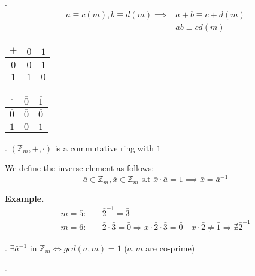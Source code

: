 \Remark.
\begin{align*}
  a \equiv c(m), b \equiv d(m) \implies & a+b \equiv c+d(m) \\
                                        & ab \equiv cd (m)
\end{align*}
\begin{center}
\begin{minipage}[t]{0.2\textwidth}
    \begin{tabular}{c|cc}
      $+$             & $\overline{0}$  & $\overline{1}$\\
      \hline
      $\overline{0}$  & $\overline{0}$  & $\overline{1}$\\
      $\overline{1}$  & $\overline{1}$  & $\overline{0}$\\
    \end{tabular}
\end{minipage}
\begin{minipage}[t]{0.2\textwidth}
  \begin{tabular}{c|cc}
    $\cdot$         & $\overline{0}$  & $\overline{1}$\\
    \hline
    $\overline{0}$  & $\overline{0}$  & $\overline{0}$\\
    $\overline{1}$  & $\overline{0}$  & $\overline{1}$\\
  \end{tabular}
\end{minipage}
\end{center}

\Theorem.
$(\mathbb{Z}_m, + , \cdot)$ is a commutative ring with $1$

\begin{definition}
  We define the inverse element as follows:
\[
  \bar{a} \in \mathbb{Z}_m, \bar{x} \in \mathbb{Z}_m \text{ s.t }
  \bar{x} \cdot \bar{a} = \bar{1} \implies \bar{x} = \bar{a}^{-1}
\]
\end{definition}

\textbf{Example.}
\begin{align*}
  m = 5: &\quad \bar{2}^{-1} = \bar{3} \\
  m = 6: &\quad \bar{2}\cdot\bar{3} = \bar{0} \Rightarrow \bar{x} \cdot \bar{2} \cdot \bar{3} = \bar{0} \quad \bar{x} \cdot \bar{2} \neq \bar{1} \Rightarrow \nexists \bar{2}^{-1}
\end{align*}

\Theorem.
$\exists \bar{a}^{-1} \text{ in } \mathbb{Z}_m \iff gcd(a,m) = 1$ ($a,m$ are co-prime)

\Proof.

